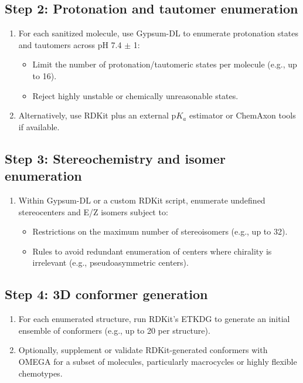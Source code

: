 \documentclass[12pt, a4paper]{article}
\begin{document}
\subsection{Step 2: Protonation and tautomer enumeration}

\begin{enumerate}
  \item For each sanitized molecule, use Gypsum-DL to enumerate protonation states and tautomers across pH 7.4 \(\pm\) 1:
  \begin{itemize}
    \item Limit the number of protonation/tautomeric states per molecule (e.g., up to 16).
    \item Reject highly unstable or chemically unreasonable states.
  \end{itemize}
  \item Alternatively, use RDKit plus an external p$K_a$ estimator or ChemAxon tools if available.
\end{enumerate}

\subsection{Step 3: Stereochemistry and isomer enumeration}

\begin{enumerate}
  \item Within Gypsum-DL or a custom RDKit script, enumerate undefined stereocenters and E/Z isomers subject to:
  \begin{itemize}
    \item Restrictions on the maximum number of stereoisomers (e.g., up to 32).
    \item Rules to avoid redundant enumeration of centers where chirality is irrelevant (e.g., pseudoasymmetric centers).
  \end{itemize}
\end{enumerate}

\subsection{Step 4: 3D conformer generation}

\begin{enumerate}
  \item For each enumerated structure, run RDKit's ETKDG to generate an initial ensemble of conformers (e.g., up to 20 per structure).
  \item Optionally, supplement or validate RDKit-generated conformers with OMEGA for a subset of molecules, particularly macrocycles or highly flexible chemotypes.\cite{CH6_Hawkins2010,CH6_Riniker2015}
\end{enumerate}
\end{document}
